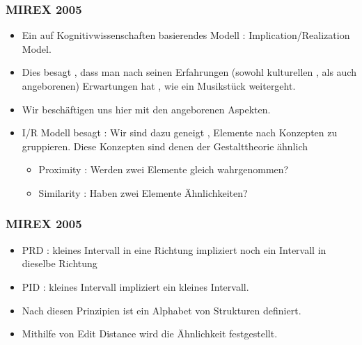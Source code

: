 \documentclass{beamer}
\begin{document}
		\begin{frame}
			\frametitle{MIREX 2005}
			
			\begin{itemize}
				\item Ein auf Kognitivwissenschaften basierendes Modell : Implication/Realization Model.
				\item Dies besagt , dass man nach seinen Erfahrungen (sowohl kulturellen , als auch angeborenen) Erwartungen hat , wie ein Musikstück weitergeht. 
				\item Wir beschäftigen uns hier mit den angeborenen Aspekten.
				\item I/R Modell besagt : Wir sind dazu geneigt , Elemente nach Konzepten zu gruppieren. Diese Konzepten sind denen der Gestalttheorie ähnlich
					\begin{itemize}
						\item Proximity : Werden zwei Elemente gleich wahrgenommen?
						\item Similarity : Haben zwei Elemente Ähnlichkeiten?
					\end{itemize}
			\end{itemize}
		\end{frame}


		\begin{frame}
			\frametitle{MIREX 2005}
			\begin{itemize}
				\item PRD : kleines Intervall in eine Richtung impliziert noch ein Intervall in dieselbe Richtung
				\item PID : kleines Intervall impliziert ein kleines Intervall.
				\item Nach diesen Prinzipien ist ein Alphabet von Strukturen definiert.
				\item Mithilfe von Edit Distance wird die Ähnlichkeit festgestellt.
			\end{itemize}
		\end{frame}
\end{document}
